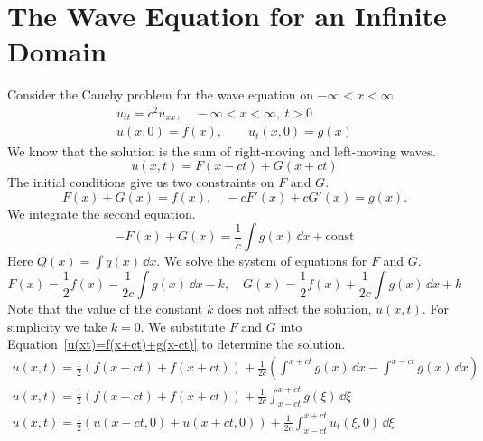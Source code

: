 





\section{The Wave Equation for an Infinite Domain}




Consider the Cauchy problem for the wave equation on $-\infty < x < \infty$.
\begin{gather*}
  u_{t t} = c^2 u_{x x}, \quad -\infty < x < \infty, \ t > 0 \\
  u(x,0) = f(x), \qquad u_t(x,0) = g(x)
\end{gather*}
We know that the solution is the sum of right-moving and left-moving waves.
\begin{equation}
  \label{u(xt)=f(x+ct)+g(x-ct)}
  u(x,t) = F(x - c t) + G(x + c t)
\end{equation}
The initial conditions give us two constraints on $F$ and $G$.
\[
F(x) + G(x) = f(x), \quad
- c F'(x) + c G'(x) = g(x).
\]
We integrate the second equation.
\[
- F(x) + G(x) = \frac{1}{c} \int g(x)\,\dd x + \mathrm{const}
\]
Here $Q(x) = \int q(x) \,\dd x$.
We solve the system of equations for $F$ and $G$.
\[
F(x) = \frac{1}{2} f(x) - \frac{1}{2c} \int g(x)\,\dd x - k, \quad
G(x) = \frac{1}{2} f(x) + \frac{1}{2c} \int g(x)\,\dd x + k
\]
Note that the value of the constant $k$ does not affect the solution, $u(x,t)$.
For simplicity we take $k = 0$.  We substitute $F$ and $G$ into 
Equation~\ref{u(xt)=f(x+ct)+g(x-ct)} to determine the solution.
\begin{gather*}
  u(x,t) = \frac{1}{2} \left( f(x - c t) + f(x + c t) \right)
  + \frac{1}{2c} \left( \int^{x + c t} g(x)\,\dd x - \int^{x - c t} g(x)\,\dd x \right) 
  \\
  u(x,t) = \frac{1}{2} \left( f(x - c t) + f(x + c t) \right)
  + \frac{1}{2c} \int_{x - c t}^{x + c t} g(\xi) \,\dd \xi \\
  \boxed{
    u(x,t) = \frac{1}{2} \left( u(x - c t,0) + u(x + c t,0) \right)
    + \frac{1}{2c} \int_{x - c t}^{x + c t} u_t(\xi,0) \,\dd \xi
    }
\end{gather*}








